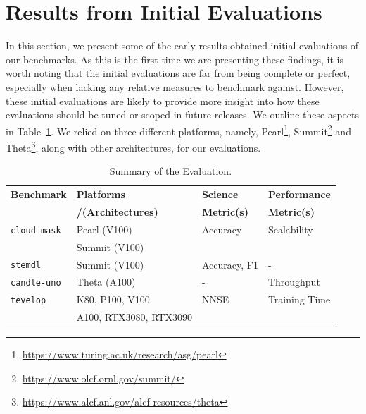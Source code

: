 \section{Results from Initial Evaluations}
\label{sec:evaluation}


In this section, we present some of the early results obtained initial evaluations of our benchmarks. As this is the first time we are presenting these findings, it is worth noting that the initial evaluations are far from being complete or perfect, especially when lacking any relative measures to benchmark against. However, these initial evaluations are likely to provide more insight into how these evaluations should be tuned or scoped in future releases.  We outline these aspects in Table~\ref{tab:eval-summary}. We relied on three different platforms, namely,  Pearl\footnote{\url{https://www.turing.ac.uk/research/asg/pearl}}, Summit\footnote{\url{https://www.olcf.ornl.gov/summit/}} and Theta\footnote{\url{https://www.alcf.anl.gov/alcf-resources/theta}}, along with other architectures, for our evaluations.

\begin{small}
\begin{table}
    \caption{Summary of the Evaluation.}
    \label{tab:eval-summary}
    \centering
    \begin{tabular}{|l|l|l|l|}
        \hline
        {\bf Benchmark}	& {\bf Platforms}		 & {\bf Science }   & {\bf Performance}\\
                    	& {\bf /(Architectures)} & {\bf Metric(s)}  & {\bf Metric(s)}\\
        \hline
        \hline
        {\tt cloud-mask}	& Pearl (V100) 		& Accuracy			& Scalability\\
                        	& Summit (V100)		&       			& \\
        \hline
        {\tt stemdl}		& Summit (V100)		& Accuracy, F1		& -\\
        \hline
        {\tt candle-uno}	& Theta (A100)		& -					& Throughput\\
        \hline
        {\tt tevelop}		& K80, P100, V100        & NNSE		        & Training Time\\
                    		& A100, RTX3080, RTX3090	&                   & \\
        \hline
        \hline
    \end{tabular}
 \end{table}
\end{small}

